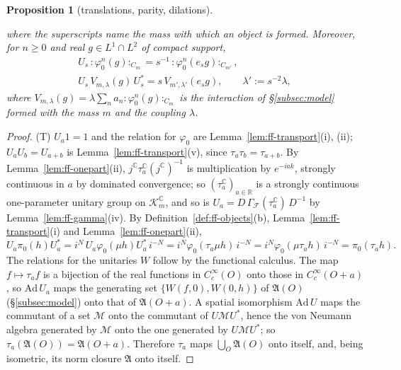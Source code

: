 \documentclass[11pt,a4paper]{article}
\theoremstyle{plain}
\newtheorem{proposition}[theorem]{Proposition}
\theoremstyle{definition}
\theoremstyle{plain}
\theoremstyle{definition}
\newcommand{\R}{\mathbb{R}}
\newcommand{\C}{\mathbb{C}}
\newcommand{\A}{\mathfrak{A}}
\begin{document}
\begin{proposition}[translations, parity, dilations]
\begin{enumerate}
where the superscripts name the mass with which an object is formed.  Moreover, for $n\ge0$ and
real $g\in L^1\cap L^2$ of compact support,
\begin{gather*}
 U_s\,{:}\varphi_0^n(g){:}_{C_m}=s^{-1}\,{:}\varphi_0^n(e_sg){:}_{C_{m'}},\\
 U_s\,V_{m,\lambda}(g)\,U_s^*=s\,V_{m',\lambda'}(e_sg),\qquad\lambda':=s^{-2}\lambda ,
\end{gather*}
where $V_{m,\lambda}(g)=\lambda\sum_na_n{:}\varphi_0^n(g){:}_{C_m}$ is the interaction of
\S\ref{subsec:model} formed with the mass $m$ and the coupling $\lambda$.
\end{enumerate}
\end{proposition}

\begin{proof}
(T) $U_a1=1$ and the relation for $\varphi_0$ are Lemma~\ref{lem:ff-transport}(i), (ii);
$U_aU_b=U_{a+b}$ is Lemma~\ref{lem:ff-transport}(v), since $\tau_a\tau_b=\tau_{a+b}$.  By
Lemma~\ref{lem:ff-onepart}(ii), $j^{\C}\tau_a^{\C}(j^{\C})^{-1}$ is multiplication by $e^{-iak}$,
strongly continuous in $a$ by dominated convergence; so $(\tau_a^{\C})_{a\in\R}$ is a strongly
continuous one-parameter unitary group on $\mathcal K_m^{\C}$, and so is
$U_a=D\,\Gamma_{\!\mathcal F}(\tau_a^{\C})\,D^{-1}$ by Lemma~\ref{lem:ff-gamma}(iv).  By
Definition~\ref{def:ff-objects}(b), Lemma~\ref{lem:ff-transport}(i) and
Lemma~\ref{lem:ff-onepart}(ii),
\[
 U_a\pi_0(h)U_a^*=i^N\,U_a\varphi_0(\mu h)U_a^*\,i^{-N}=i^N\varphi_0(\tau_a\mu h)\,i^{-N}
 =i^N\varphi_0(\mu\tau_ah)\,i^{-N}=\pi_0(\tau_ah) .
\]
The relations for the unitaries $W$ follow by the functional calculus.  The map
$f\mapsto\tau_af$ is a bijection of the real functions in $C_c^\infty(O)$ onto those in
$C_c^\infty(O+a)$, so $\mathrm{Ad}\,U_a$ maps the generating set $\{W(f,0),W(0,h)\}$ of $\A(O)$
(\S\ref{subsec:model}) onto that of $\A(O+a)$.  A spatial isomorphism $\mathrm{Ad}\,U$ maps the
commutant of a set $\mathcal M$ onto the commutant of $U\mathcal MU^*$, hence the von Neumann
algebra generated by $\mathcal M$ onto the one generated by $U\mathcal MU^*$; so
$\tau_a(\A(O))=\A(O+a)$.  Therefore $\tau_a$ maps $\bigcup_O\A(O)$ onto itself, and, being
isometric, its norm closure $\A$ onto itself.


\end{proof}
\end{document}
